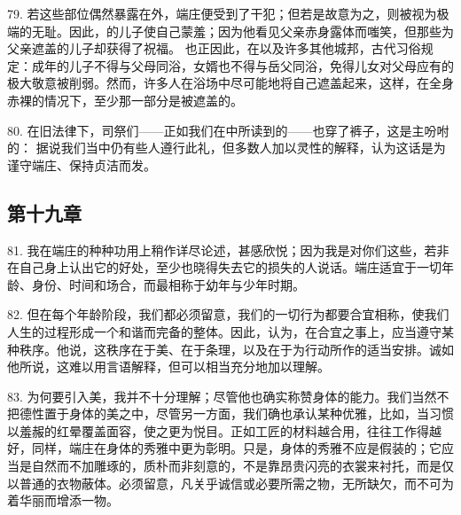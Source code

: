 79. 若这些部位偶然暴露在外，端庄便受到了干犯；但若是故意为之，则被视为极端的无耻。因此，的儿子使自己蒙羞；因为他看见父亲赤身露体而嗤笑，但那些为父亲遮盖的儿子却获得了祝福。 也正因此，在以及许多其他城邦，古代习俗规定：成年的儿子不得与父母同浴，女婿也不得与岳父同浴，免得儿女对父母应有的极大敬意被削弱。然而，许多人在浴场中尽可能地将自己遮盖起来，这样，在全身赤裸的情况下，至少那一部分是被遮盖的。\par

80. 在旧法律下，司祭们——正如我们在中所读到的——也穿了裤子，这是主吩咐的： 据说我们当中仍有些人遵行此礼，但多数人加以灵性的解释，认为这话是为谨守端庄、保持贞洁而发。\par


\subsection{第十九章}

\par

81. 我在端庄的种种功用上稍作详尽论述，甚感欣悦；因为我是对你们这些，若非在自己身上认出它的好处，至少也晓得失去它的损失的人说话。端庄适宜于一切年龄、身份、时间和场合，而最相称于幼年与少年时期。\par

82. 但在每个年龄阶段，我们都必须留意，我们的一切行为都要合宜相称，使我们人生的过程形成一个和谐而完备的整体。因此，认为，在合宜之事上，应当遵守某种秩序。他说，这秩序在于美、在于条理，以及在于为行动所作的适当安排。诚如他所说，这难以用言语解释，但可以相当充分地加以理解。\par

83. 为何要引入美，我并不十分理解；尽管他也确实称赞身体的能力。我们当然不把德性置于身体的美之中，尽管另一方面，我们确也承认某种优雅，比如，当习惯以羞赧的红晕覆盖面容，使之更为悦目。正如工匠的材料越合用，往往工作得越好，同样，端庄在身体的秀雅中更为彰明。只是，身体的秀雅不应是假装的；它应当是自然而不加雕琢的，质朴而非刻意的，不是靠昂贵闪亮的衣裳来衬托，而是仅以普通的衣物蔽体。必须留意，凡关乎诚信或必要所需之物，无所缺欠，而不可为着华丽而增添一物。\par

